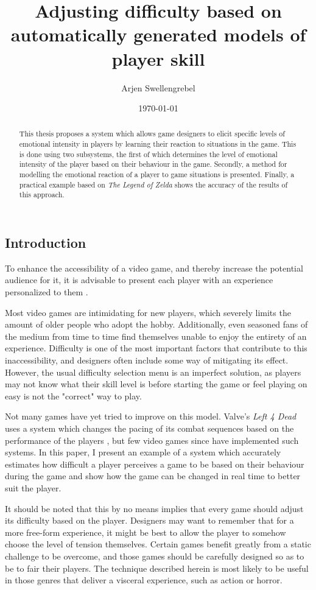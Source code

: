 \documentclass[a4paper]{article}
\title{Adjusting difficulty based on automatically generated models of player skill}
\author{Arjen Swellengrebel}
\date{\today}
\begin{document}
\maketitle

\begin{multicols*}{2}
\begin{abstract}
This thesis proposes a system which allows game designers to elicit specific levels of emotional intensity in players by learning their reaction to situations in the game.
This is done using two subsystems, the first of which determines the level of emotional intensity of the player based on their behaviour in the game.
Secondly, a method for modelling the emotional reaction of a player to game situations is presented.
Finally, a practical example based on \emph{The Legend of Zelda} shows the accuracy of the results of this approach.
\end{abstract}

\section{Introduction}
To enhance the accessibility of a video game, and thereby increase the potential audience for it, it is advisable to present each player with an experience personalized to them \cite{playercentered}. 

Most video games are intimidating for new players, which severely limits the amount of older people who adopt the hobby. Additionally, even seasoned fans of the medium from time to time find themselves unable to enjoy the entirety of an experience. Difficulty is one of the most important factors that contribute to this inaccessibility, and designers often include some way of mitigating its effect. However, the usual difficulty selection menu is an imperfect solution, as players may not know what their skill level is before starting the game or feel playing on easy is not the "correct" way to play.

Not many games have yet tried to improve on this model. Valve's \emph{Left 4 Dead} uses a system which changes the pacing of its combat sequences based on the performance of the players \cite{left4dead}, but few video games since have implemented such systems. In this paper, I present an example of a system which accurately estimates how difficult a player perceives a game to be based on their behaviour during the game and show how the game can be changed in real time to better suit the player.

It should be noted that this by no means implies that every game should adjust its difficulty based on the player. Designers may want to remember that for a more free-form experience, it might be best to allow the player to somehow choose the level of tension themselves. Certain games benefit greatly from a static challenge to be overcome, and those games should be carefully designed so as to be to fair their players. The technique described herein is most likely to be useful in those genres that deliver a visceral experience, such as action or horror.


\end{multicols*}
\end{document}
